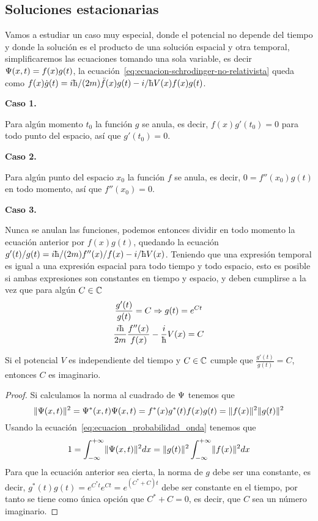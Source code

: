 \subsection{Soluciones estacionarias}\label{subsec:soluciones-estacionarias}
Vamos a estudiar un caso muy especial, donde el potencial no depende del tiempo y donde la solución es el producto de una solución espacial y otra temporal, simplificaremos las ecuaciones tomando una sola variable, es decir $\Psi(x,t)=f(x)g(t)$, la ecuación~\eqref{eq:ecuacion-schrodinger-no-relativista} queda como $f(x)\dot{g}(t)=i\planckbarsymbol/(2m)\ddot{f}(x)g(t)-i/\planckbarsymbol V(x)f(x)g(t)$.


\textbf{Caso 1.}

Para algún momento $t_0$ la función $g$ se anula, es decir, $f(x)g'(t_0)=0$ para todo punto del espacio, así que $g'(t_0)=0$.

\textbf{Caso 2.}

Para algún punto del espacio $x_0$ la función $f$ se anula, es decir, $0=f''(x_0)g(t)$ en todo momento, así que $f''(x_0)=0$.

\textbf{Caso 3.}

Nunca se anulan las funciones, podemos entonces dividir en todo momento la ecuación anterior por $f(x)g(t)$, quedando la ecuación $g'(t)/g(t)=i\planckbarsymbol/(2m)f^{\prime\prime}(x)/f(x)-i/\planckbarsymbol V(x)$.
Teniendo que una expresión temporal es igual a una expresión espacial para todo tiempo y todo espacio, esto es posible si ambas expresiones son constantes en tiempo y espacio, y deben cumplirse a la vez que para algún $C\in\mathbb{C}$
\begin{gather*}
    \frac{g'(t)}{g(t)}=C\Rightarrow g(t)=e^{Ct}
    \\
    \frac{i\planckbarsymbol}{2m}\frac{f''(x)}{f(x)}-\frac{i}{\planckbarsymbol}V(x)=C
\end{gather*}

\begin{resultado}
    Si el potencial $V$ es independiente del tiempo y $C\in\mathbb{C}$ cumple que $\frac{g'(t)}{g(t)}=C$, entonces $C$ es imaginario.
\end{resultado}
\begin{proof}
    Si calculamos la norma al cuadrado de $\Psi$ tenemos que
    \begin{equation*}
        \lVert\Psi(x,t)\rVert^2=\Psi^*(x,t)\Psi(x,t)=f^*(x)g^*(t)f(x)g(t)=\lVert f(x)\rVert^2\lVert g(t)\rVert^2
    \end{equation*}
    Usando la ecuación~\eqref{eq:ecuacion_probabilidad_onda} tenemos que
    \begin{equation*}
        1=\int_{-\infty}^{+\infty}\lVert\Psi(x,t)\rVert^2 dx=\lVert g(t)\rVert^2\int_{-\infty}^{+\infty}\lVert f(x)\rVert^2 dx
    \end{equation*}
    Para que la ecuación anterior sea cierta, la norma de $g$ debe ser una constante, es decir, $g^*(t)g(t)=e^{C^*t}e^{Ct}=e^{(C^*+C)t}$ debe ser constante en el tiempo, por tanto se tiene como única opción que $C^*+C=0$, es decir, que $C$ sea un número imaginario.
\end{proof}

